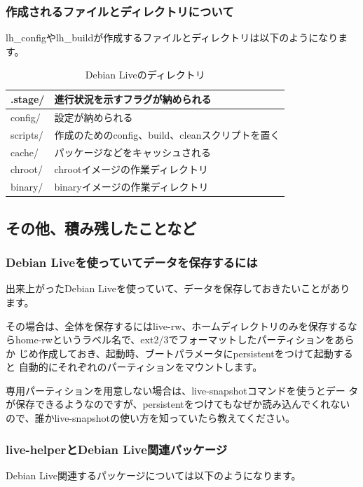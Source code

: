 \documentclass[mingoth,a4paper]{jsarticle}
\begin{document}
\subsubsection{作成されるファイルとディレクトリについて}

lh\_configやlh\_buildが作成するファイルとディレクトリは以下のようになります。

\begin{table}[htbp]
\caption{Debian Liveのディレクトリ}
\begin{tabular}{|l|l|}
\hline
.stage/ & 進行状況を示すフラグが納められる \\ \hline
config/ & 設定が納められる \\ \hline
scripts/ & 作成のためのconfig、build、cleanスクリプトを置く \\ \hline
cache/ & パッケージなどをキャッシュされる \\ \hline
chroot/ & chrootイメージの作業ディレクトリ \\ \hline
binary/ & binaryイメージの作業ディレクトリ \\ \hline
\end{tabular}
\label{}
\end{table}

\subsection{その他、積み残したことなど}

\subsubsection{Debian Liveを使っていてデータを保存するには}
出来上がったDebian Liveを使っていて、データを保存しておきたいことがあり
ます。

その場合は、全体を保存するにはlive-rw、ホームディレクトリのみを保存するな
らhome-rwというラベル名で、ext2/3でフォーマットしたパーティションをあらか
じめ作成しておき、起動時、ブートパラメータにpersistentをつけて起動すると
自動的にそれぞれのパーティションをマウントします。

専用パーティションを用意しない場合は、live-snapshotコマンドを使うとデー
タが保存できるようなのですが、persistentをつけてもなぜか読み込んでくれないので、誰かlive-snapshotの使い方を知っていたら教えてください。

\newpage

\subsubsection{live-helperとDebian Live関連パッケージ}
Debian Live関連するパッケージについては以下のようになります。
\end{document}
